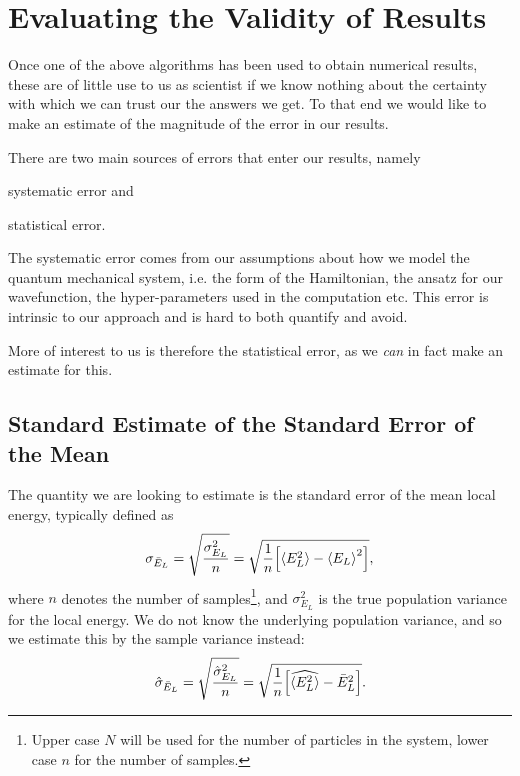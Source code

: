\documentclass[twocolumn]{article}
\begin{document}
\section{Evaluating the Validity of Results}

Once one of the above algorithms has been used to obtain numerical results,
these are of little use to us as scientist if we know nothing about the
certainty with which we can trust our the answers we get. To that end we would
like to make an estimate of the magnitude of the error in our results.

There are two main sources of errors that enter our results, namely 
\begin{inparaenum}[1)]
    \item systematic error and
    \item statistical error.
\end{inparaenum}
The systematic error comes from our assumptions about how we model the quantum
mechanical system, i.e. the form of the Hamiltonian, the ansatz for our
wavefunction, the hyper-parameters used in the computation etc. This error is
intrinsic to our approach and is hard to both quantify and avoid.

More of interest to us is therefore the statistical error, as we \textit{can} in
fact make an estimate for this. 

\subsection{Standard Estimate of the Standard Error of the Mean}

The quantity we are looking to estimate is the
standard error of the mean local energy, typically defined as
\begin{align}
    \sigma_{\bar E_L} = \sqrt{\frac{\sigma_{E_L}^2}{n}}= \sqrt{\frac{1}{n}
    \qty[\expval{E_L^2} - \expval{E_L}^2]} \label{eq:SE-def},
\end{align}
where $n$ denotes the number of samples\footnote{Upper case $N$ will be used for
the number of particles in the system, lower case $n$ for the number of
samples.}, and $\sigma_{E_L}^2$ is the true population variance for the local energy. We
do not know the underlying population variance, and so we estimate this by the
sample variance instead:
\begin{align}
    \hat\sigma_{\bar E_L} = \sqrt{\frac{\hat\sigma_{E_L}^2}{n}}=
    \sqrt{\frac{1}{n}
    \qty[\widehat{\expval{E_L^2}} - \bar{E}_L^2]}
    \label{eq:SE-est-def}.
\end{align}
\end{document}
